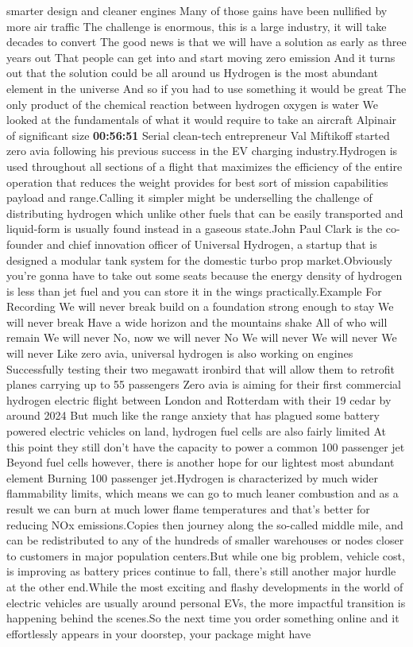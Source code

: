\documentclass{article}%
\begin{document}
smarter design and cleaner engines Many of those gains have been nullified by more air traffic The challenge is enormous, this is a large industry, it will take decades to convert The good news is that we will have a solution as early as three years out That people can get into and start moving zero emission And it turns out that the solution could be all around us Hydrogen is the most abundant element in the universe And so if you had to use something it would be great The only product of the chemical reaction between hydrogen oxygen is water We looked at the fundamentals of what it would require to take an aircraft Alpinair of significant size%
\textbf{00:56:51}%
\newline%
Serial clean{-}tech entrepreneur Val Miftikoff started zero avia following his previous success in the EV charging industry.Hydrogen is used throughout all sections of a flight that maximizes the efficiency of the entire operation that reduces the weight provides for best sort of mission capabilities payload and range.Calling it simpler might be underselling the challenge of distributing hydrogen which unlike other fuels that can be easily transported and liquid{-}form is usually found instead in a gaseous state.John Paul Clark is the co{-}founder and chief innovation officer of Universal Hydrogen, a startup that is designed a modular tank system for the domestic turbo prop market.Obviously you're gonna have to take out some seats because the energy density of hydrogen is less than jet fuel and you can store it in the wings practically.Example For Recording We will never break build on a foundation strong enough to stay We will never break Have a wide horizon and the mountains shake All of who will remain We will never No, now we will never No We will never We will never We will never Like zero avia, universal hydrogen is also working on engines Successfully testing their two megawatt ironbird that will allow them to retrofit planes carrying up to 55 passengers Zero avia is aiming for their first commercial hydrogen electric flight between London and Rotterdam with their 19 cedar by around 2024 But much like the range anxiety that has plagued some battery powered electric vehicles on land, hydrogen fuel cells are also fairly limited At this point they still don't have the capacity to power a common 100 passenger jet Beyond fuel cells however, there is another hope for our lightest most abundant element Burning  100 passenger jet.Hydrogen is characterized by much wider flammability limits, which means we can go to much leaner combustion and as a result we can burn at much lower flame temperatures and that's better for reducing NOx emissions.Copies then journey along the so{-}called middle mile, and can be redistributed to any of the hundreds of smaller warehouses or nodes closer to customers in major population centers.But while one big problem, vehicle cost, is improving as battery prices continue to fall, there's still another major hurdle at the other end.While the most exciting and flashy developments in the world of electric vehicles are usually around personal EVs, the more impactful transition is happening behind the scenes.So the next time you order something online and it effortlessly appears in your doorstep, your package might have 
\end{document}
